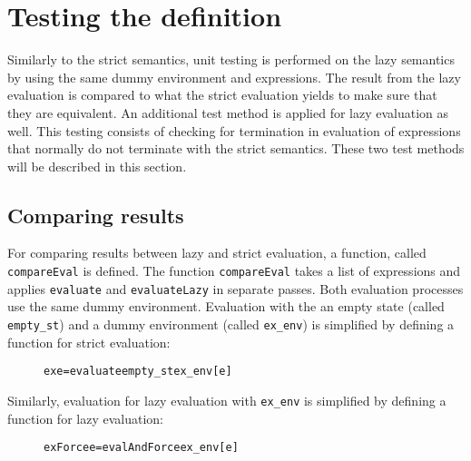 \section{Testing the definition}

Similarly to the strict semantics, unit testing is performed on the lazy
semantics by using the same dummy environment and expressions. 
The result from the lazy evaluation is compared to what the strict evaluation
yields to make sure that they are equivalent. An additional test method is
applied for lazy evaluation as well. This testing consists of checking for
termination in evaluation of expressions that normally do not terminate with
the strict semantics. These two test methods will be described in this section.

\subsection{Comparing results}
\label{lazy:compres}
For comparing results between lazy and strict evaluation, a function, called
\texttt{compareEval} is defined. The function \texttt{compareEval} takes a list
of expressions and applies \texttt{evaluate} and \texttt{evaluateLazy}
in separate passes. Both evaluation processes use the same dummy environment.
Evaluation with the an empty state (called \texttt{empty\_st}) and
a dummy environment (called \texttt{ex\_env}) is simplified by defining a
function for strict evaluation:

\begin{figure}[H]
\begin{alltt}
  ex e = evaluate empty_st ex_env [e]
\end{alltt}
\end{figure}

\noindent Similarly, evaluation for lazy evaluation with \texttt{ex\_env} is
simplified by defining a function for lazy evaluation:

\begin{figure}[H]
\begin{alltt}
  exForce e = evalAndForce ex_env [e]
\end{alltt}
\end{figure}

